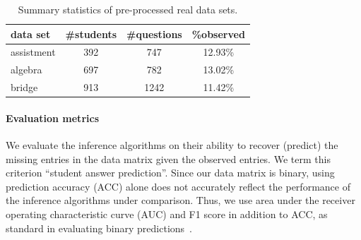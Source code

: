 \documentclass{edm_article}
\newcommand{\ml}[1]{\textcolor{orange}{\bf [LAN bandit: #1]}}
\begin{document}
\begin{table}[]
\caption{Summary statistics of pre-processed real data sets.}
\vspace{-5pt}
\begin{tabular}{lccc}
\toprule
\textbf{data set} & \textbf{\#students} & \textbf{\#questions} & \textbf{\%observed} \\ \hline
assistment        & 392                  & 747                   & 12.93\%                      \\
algebra           & 697                  & 782                   & 13.02\%                      \\
bridge            & 913                  & 1242                  & 11.42\%                      \\ \bottomrule
\end{tabular}
\label{tab:data-stat}
\end{table}

\vspace{-10pt}
\paragraph{Evaluation metrics} We evaluate the inference algorithms on their ability to recover (predict) the missing entries in the data matrix given the observed entries. We term this criterion ``student answer prediction''. Since our data matrix is binary, using prediction accuracy (ACC) alone does not accurately reflect the performance of the inference algorithms under comparison. Thus, we use area under the receiver operating characteristic curve (AUC) and F1 score in addition to ACC, as standard in evaluating binary predictions~\cite{hastie2009elements}.

\end{document}
